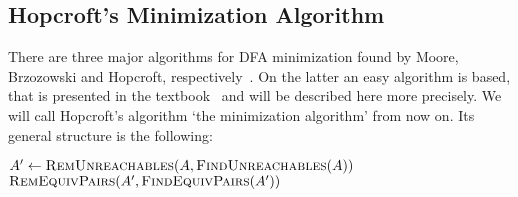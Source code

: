 \subsection{Hopcroft's Minimization Algorithm}

There are three major algorithms for DFA minimization found by Moore, Brzozowski and Hopcroft, respectively~\cite[p. 2]{BBC10}. On the latter an easy algorithm is based, that is presented in the textbook~\cite{HMU01} and will be described here more precisely. We will call Hopcroft's algorithm `the minimization algorithm' from now on. Its general structure is the following:
\vspace{0.2cm}
\begin{algorithmic}[1] \label{ch:2:minalg}
	\State $A' \gets \textsc{RemUnreachables}(A, \textsc{FindUnreachables}(A))$
	\State \Return $\textsc{RemEquivPairs}(A', \textsc{FindEquivPairs}(A'))$
	\EndFunction
\end{algorithmic}
\vspace{0.2cm}

